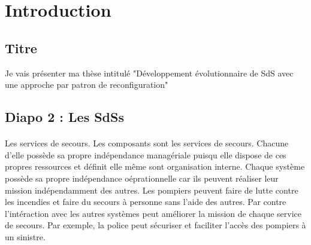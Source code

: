 \section{Introduction}

\subsection{Titre}
Je vais présenter ma thèse intitulé "Développement évolutionnaire de
SdS avec une approche par patron de reconfiguration" 

\subsection{Diapo 2 : Les SdSs}
\paragraph{}

Les services de secours. Les composants sont les services de secours.
Chacune d'elle possède sa propre indépendance managériale puisqu elle
dispose de ces propres ressources et définit elle même sont
organisation interne. Chaque système possède sa propre indépendance
oéprationnelle car ils peuvent réaliser leur mission indépendamment
des autres. Les pompiers peuvent faire de lutte contre les incendies
et faire du secours à personne sans l'aide des autres. Par contre
l'intéraction avec les autres systèmes peut améliorer la mission de 
chaque service de secours. Par exemple, la police peut sécuriser et
faciliter l'accès des pompiers à un sinistre.




